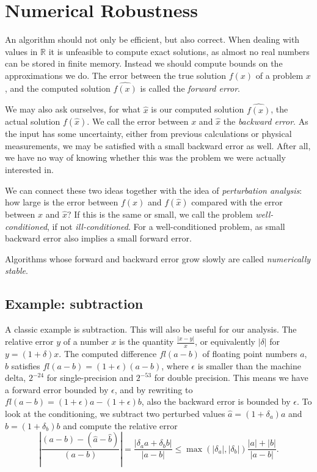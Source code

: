 \section{Numerical Robustness}

An algorithm should not only be efficient, but also correct. When dealing
with values in $\mathbb{R}$ it is unfeasible to compute exact solutions, as
almost no real numbers can be stored in finite memory. Instead we should
compute bounds on the approximations we do. The error between the true
solution $f(x)$ of a problem $x$, and the computed solution $\widehat{f(x)}$
is called the \textit{forward error}. 

We may also ask ourselves, for what $\hat{x}$ is our computed solution 
$\widehat{f(x)}$, the actual solution $f(\hat{x})$. We call the error between 
$x$ and $\hat{x}$ the \textit{backward error}. As the input has some 
uncertainty, either from previous calculations or physical
measurements, we may be satisfied with a small backward error as well.
After all, we have no way of knowing whether this was the problem we were 
actually interested in.

We can connect these two ideas together with the idea of 
\textit{perturbation analysis}:
how large is the error between $f(x)$ and $f(\hat{x})$ compared with
the error between $x$ and $\hat{x}$? If this is the same or small,
we call the problem \textit{well-conditioned}, if not \textit{ill-conditioned}. 
For a well-conditioned problem, as small backward error also implies a small 
forward error.

Algorithms whose forward and backward error grow slowly are called 
\textit{numerically stable}.

\subsection{Example: subtraction}

A classic example is subtraction. This will also be useful for our analysis.
The relative error $y$ of a number $x$ is the quantity $\frac{|x - y|}{x}$, or 
equivalently $|\delta|$ for $y = (1 + \delta)x$. The computed difference
$fl(a - b)$ of floating point numbers $a$, $b$ satisfies 
$fl(a - b) = (1 + \epsilon)(a - b)$, where $\epsilon$ is smaller than the
machine delta, $2^{-24}$ for single-precision and $2^{-53}$ for double 
precision. This means we have a forward error bounded by $\epsilon$, and by 
rewriting to $fl(a - b) = (1 + \epsilon)a - (1 + \epsilon)b$, also the backward 
error is bounded by $\epsilon$. To look at the conditioning, we subtract two 
perturbed values $\hat{a} = (1 + \delta_a)a$ and $\hat{b} = (1 + \delta_b)b$ 
and compute the relative error
$$\left|\frac{(a - b) - (\hat{a} - \hat{b})}{(a - b)}\right| = 
\frac{|\delta_a a + \delta_b b|}{|a - b|} \leq 
\max(|\delta_a|, |\delta_b|) \frac{|a| + |b|}{|a - b|}.$$

